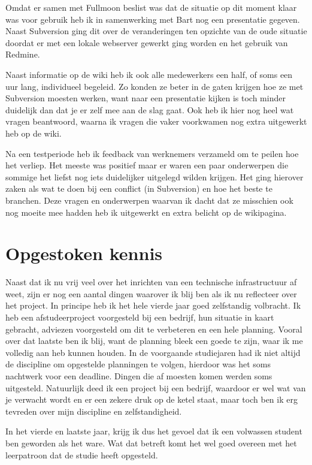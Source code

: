 Omdat er samen met Fullmoon beslist was dat de situatie op dit moment klaar was voor gebruik heb ik in samenwerking met Bart nog een presentatie gegeven. Naast Subversion ging dit over de veranderingen ten opzichte van de oude situatie doordat er met een lokale webserver gewerkt ging worden en het gebruik van Redmine.

Naast informatie op de wiki heb ik ook alle medewerkers een half, of soms een uur lang, individueel begeleid. Zo konden ze beter in de gaten krijgen hoe ze met Subversion moesten werken, want naar een presentatie kijken is toch minder duidelijk dan dat je er zelf mee aan de slag gaat. Ook heb ik hier nog heel wat vragen beantwoord, waarna ik vragen die vaker voorkwamen nog extra uitgewerkt heb op de wiki.

Na een testperiode heb ik feedback van werknemers verzameld om te peilen hoe het verliep. Het meeste was positief maar er waren een paar onderwerpen die sommige het liefst nog iets duidelijker uitgelegd wilden krijgen. Het ging hierover zaken als wat te doen bij een conflict (in Subversion) en hoe het beste te branchen. Deze vragen en onderwerpen waarvan ik dacht dat ze misschien ook nog moeite mee hadden heb ik uitgewerkt en extra belicht op de wikipagina.

\section{Opgestoken kennis}

Naast dat ik nu vrij veel over het inrichten van een technische infrastructuur af weet, zijn er nog een aantal dingen waarover ik blij ben als ik nu reflecteer over het project. In principe heb ik het hele vierde jaar goed zelfstandig volbracht. Ik heb een afstudeerproject voorgesteld bij een bedrijf, hun situatie in kaart gebracht, adviezen voorgesteld om dit te verbeteren en een hele planning. Vooral over dat laatste ben ik blij, want de planning bleek een goede te zijn, waar ik me volledig aan heb kunnen houden. In de voorgaande studiejaren had ik niet altijd de discipline om opgestelde planningen te volgen, hierdoor was het soms nachtwerk voor een deadline. Dingen die af moesten komen werden soms uitgesteld. Natuurlijk deed ik een project bij een bedrijf, waardoor er wel wat van je verwacht wordt en er een zekere druk op de ketel staat, maar toch ben ik erg tevreden over mijn discipline en zelfstandigheid.

In het vierde en laatste jaar, krijg ik dus het gevoel dat ik een volwassen student ben geworden als het ware. Wat dat betreft komt het wel goed overeen met het leerpatroon dat de studie heeft opgesteld.

